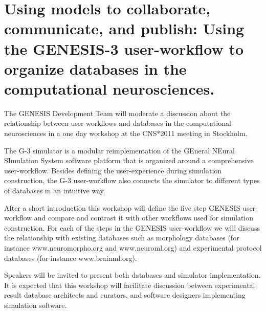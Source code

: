 \documentclass[12pt]{article}
\begin{document}


\section*{Using models to collaborate, communicate, and publish:  Using the GENESIS-3 user-workflow to organize databases in the computational neurosciences.}

The GENESIS Development Team will moderate a discussion about the
relationship between user-workflows and databases in the computational
neurosciences in a one day workshop at the CNS*2011 meeting in
Stockholm.

\vspace{3mm}

The G-3 simulator is a modular reimplementation of the GEneral NEural
SImulation System software platform that is organized around a
comprehensive user-workflow.  Besides defining the user-experience
during simulation construction, the G-3 user-workflow also connects
the simulator to different types of databases in an intuitive way.

After a short introduction this workshop will define the five step
GENESIS user-workflow and compare and contrast it with other workflows
used for simulation construction.  For each of the steps in the
GENESIS user-workflow we will discuss the relationship with existing
databases such as morphology databases (for instance
www.neuromorpho.org and www.neuroml.org) and experimental protocol
databases (for instance www.brainml.org).

Speakers will be invited to present both databases and simulator
implementation.  It is expected that this workshop will facilitate
discussion between experimental result database architects and
curators, and software designers implementing simulation software.





\end{document}

